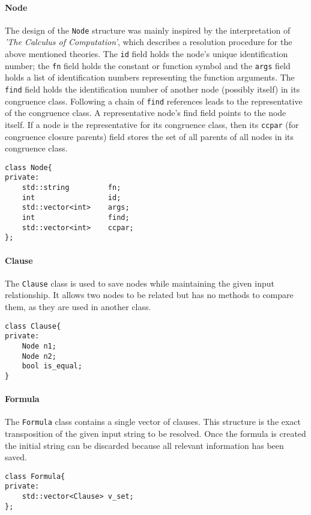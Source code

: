 \documentclass{IEEEtran}
\begin{document}
\paragraph{Node} 
The design of the \verb|Node| structure was mainly inspired by the interpretation of  \textit{'The Calculus of Computation'}\cite{10.5555/1324777}, which describes a resolution procedure for the above mentioned theories. The \verb|id| field holds the node’s unique identification number; the \verb|fn| field holds the constant or function symbol and the \verb|args| field holds a list of identification numbers representing the function arguments. The \verb|find| field holds the identification number of another node (possibly itself) in its congruence class. Following a chain of \verb|find| references leads to the representative of the congruence class. A representative node’s find field points to the node itself. If a node is the representative for its congruence class, then its \verb|ccpar| (for congruence closure parents) field stores the set of all parents of all nodes in its congruence class.
\begin{lstlisting}[style=cpp]
class Node{
private:
	std::string 		fn;                  
	int			 		id;                
	std::vector<int> 	args; 
	int			 		find;              
	std::vector<int>	ccpar;
};
\end{lstlisting}
\paragraph{Clause} 
The \verb|Clause| class is used to save nodes while maintaining the given input relationship. It allows two nodes to be related but has no methods to compare them, as they are used in another class.
\begin{lstlisting}[style=cpp]
class Clause{
private:
	Node n1;
	Node n2;
	bool is_equal;
}
\end{lstlisting}
\paragraph{Formula}
The \verb|Formula| class contains a single vector of clauses. This structure is the exact transposition of the given input string to be resolved. Once the formula is created the initial string can be discarded because all relevant information has been saved.
\begin{lstlisting}[style=cpp]
class Formula{
private:
	std::vector<Clause> v_set;
};
\end{lstlisting}
\end{document}

